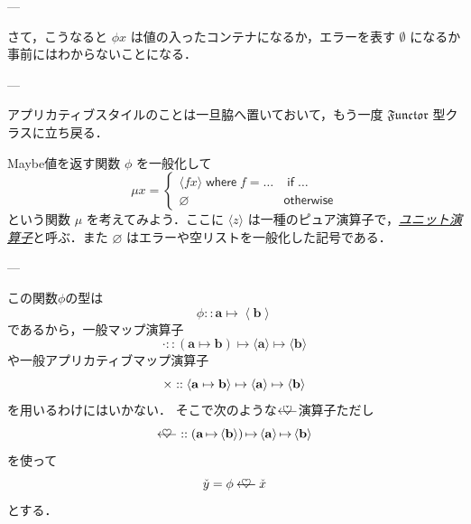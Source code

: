 \documentclass[a4paper]{jsbook}
\newcommand{\keyword}[1]{{\underline{\emph{#1}}}}
\newcommand{\mSpecialTypeClass}[1]{\mathfrak{#1}} %
\newcommand{\mFunctorTypeClass}{\mSpecialTypeClass{Functor}}
\newcommand{\mNothing}{\emptyset}
\newcommand{\mPureNothing}{\varnothing}
\newcommand{\mKeyword}[1]{\mathsf{#1}}
\newcommand{\mIfKeyword}{\mKeyword{if}}
\newcommand{\mOtherwiseKeyword}{\mKeyword{otherwise}}
\newcommand{\mWhereKeyword}{\mKeyword{where}}
\newcommand{\mUnitWith}[1]{\langle#1\rangle}
\newcommand{\mMaybe}[1]{{#1}^\text{?}}
\DeclareMathOperator{\mMapsTo}{\mapsto}
\DeclareMathOperator{\mBindMaybe}{\spadesuit}%
\DeclareMathOperator{\mIf}{\mIfKeyword}
\DeclareMathOperator{\mOtherwise}{\mOtherwiseKeyword}
\DeclareMathOperator{\mWhere}{\mWhereKeyword}
\newcommand{\mathTypeParameter}[1]{\mathbf{#1}}
\newcommand{\mathContainerVar}[1]{\Check{#1}}
\newcommand{\mathPureWith}[1]{\left\langle#1\right\rangle}
\newcommand{\mathPureType}[1]{\mathPureWith{\mathTypeParameter{#1}}}
\newcommand{\mathApplicativeGeneralMap}{\mathbin{\times}}
\newcommand{\mathBind}{\mathbin{\ooalign{$\longleftarrow$\crcr\hss$\heartsuit$\hss}}}
\newcommand{\mathGeneralMap}{\mathbin{\cdot}}
\newcommand{\mathIn}{\mathrel{::}}
\newcommand{\mathMapsTo}{\mapsto}
\newcommand{\mathMorph}[2]{#1\mathMapsTo#2}
\newcommand{\mathMorphII}[3]{#1\mathMapsTo#2\mathMapsTo#3}
\begin{document}

---

さて，こうなると $\phi x$ は値の入ったコンテナになるか，エラーを表す $\mNothing$ になるか事前にはわからないことになる．

---

アプリカティブスタイルのことは一旦脇へ置いておいて，もう一度 $\mFunctorTypeClass$ 型クラスに立ち戻る．

Maybe値を返す関数 $\phi$ を一般化して
\begin{equation}
\mu x=\begin{cases}
\mUnitWith{fx}\mWhere f=\dots&\mIf\dots\\
\mPureNothing&\mOtherwise
\end{cases}
\end{equation}
という関数 $\mu$ を考えてみよう．ここに $\mUnitWith{z}$ は一種のピュア演算子で，\keyword{ユニット演算子}と呼ぶ．また $\mPureNothing$ はエラーや空リストを一般化した記号である．

---


この関数$\phi$の型は
\begin{equation}
  \phi\mathIn\mathTypeParameter{a}\mMapsTo\mathPureWith{\mathTypeParameter{b}}
\end{equation}
であるから，一般マップ演算子
\begin{equation}
\mathGeneralMap
\mathIn{}\mathMorphII{(\mathMorph{\mathTypeParameter{a}}{\mathTypeParameter{b}})}{\langle\mathTypeParameter{a}\rangle}{\langle\mathTypeParameter{b}\rangle}
\end{equation}
や一般アプリカティブマップ演算子
\begin{equation}
\mathApplicativeGeneralMap
\mathIn{}\mathMorphII{\langle\mathMorph{\mathTypeParameter{a}}{\mathTypeParameter{b}}\rangle}{\langle\mathTypeParameter{a}\rangle}{\langle\mathTypeParameter{b}\rangle}\\
\end{equation}
を用いるわけにはいかない．
そこで次のような$\mathBind$演算子ただし
\begin{equation}
\mathBind
\mathIn
\left(\mathTypeParameter{a}\mMapsTo\mathPureType{b}\right)
\mMapsTo
\mathPureType{a}
\mMapsTo
\mathPureType{b}
\end{equation}
を使って
\begin{equation}
  \mathContainerVar{y}=\phi\mathBind\mathContainerVar{x}
\end{equation}
とする．
\end{document}
